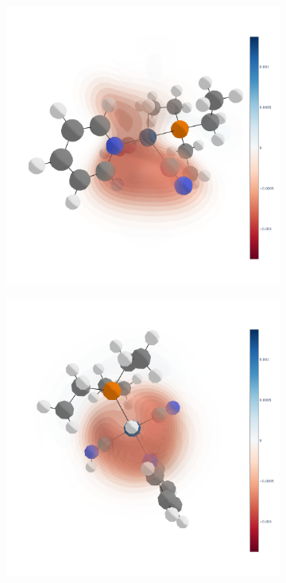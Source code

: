 \begin{figure}
  \begin{subfigure}[t]{.5\textwidth}
    \centering
    \includegraphics[width=\linewidth]{figures/evaluation/elem2-N.png}
  \end{subfigure}
  \hfill
  \begin{subfigure}[t]{.5\textwidth}
    \centering
    \includegraphics[width=\linewidth]{figures/evaluation/elem2-N-TOP.png}
  \end{subfigure}


\end{figure}
